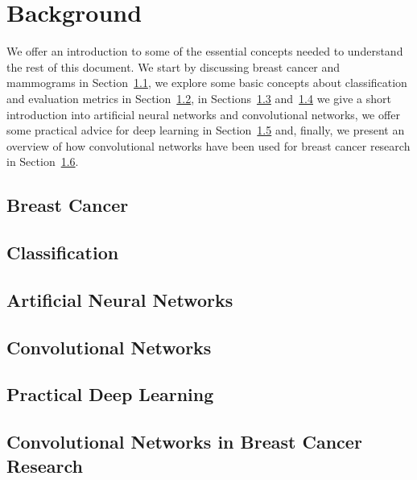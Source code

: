 \chapter{Background}
\label{ch:Background}
We offer an introduction to some of the essential concepts needed to understand the rest of this document. We start by discussing breast cancer and mammograms in Section~\ref{sec:BreastCancer}, we explore some basic concepts about classification and evaluation metrics in Section~\ref{sec:Classification}, in Sections~\ref{sec:ANNs} and~\ref{sec:ConvNets} we give a short introduction into artificial neural networks and convolutional networks, we offer some practical advice for deep learning in Section~\ref{sec:PracticalDL} and, finally, we present an overview of how convolutional networks have been used for breast cancer research in Section~\ref{sec:BreastCancerConvNets}.

\section{Breast Cancer}
\label{sec:BreastCancer}


\section{Classification}
\label{sec:Classification}


\section{Artificial Neural Networks}
\label{sec:ANNs}


\section{Convolutional Networks}
\label{sec:ConvNets}


\section{Practical Deep Learning}
\label{sec:PracticalDL}


\section{Convolutional Networks in Breast Cancer Research}
\label{sec:BreastCancerConvNets}

